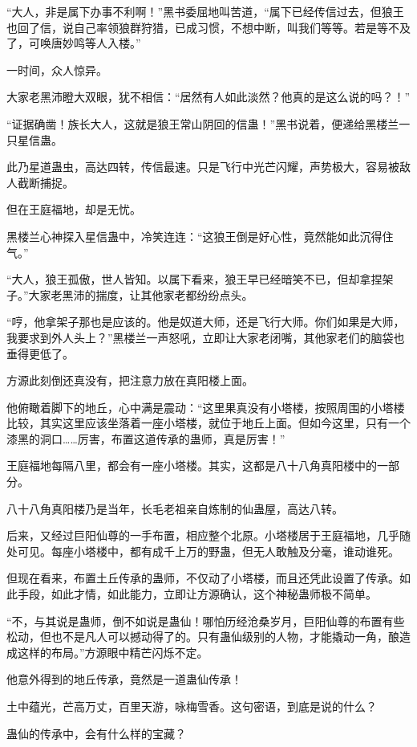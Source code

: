 \begin{this_body}
“大人，非是属下办事不利啊！”黑书委屈地叫苦道，“属下已经传信过去，但狼王也回了信，说自己率领狼群狩猎，已成习惯，不想中断，叫我们等等。若是等不及了，可唤唐妙鸣等人入楼。”

一时间，众人惊异。

大家老黑沛瞪大双眼，犹不相信：“居然有人如此淡然？他真的是这么说的吗？！”

“证据确凿！族长大人，这就是狼王常山阴回的信蛊！”黑书说着，便递给黑楼兰一只星信蛊。

此乃星道蛊虫，高达四转，传信最速。只是飞行中光芒闪耀，声势极大，容易被敌人截断捕捉。

但在王庭福地，却是无忧。

黑楼兰心神探入星信蛊中，冷笑连连：“这狼王倒是好心性，竟然能如此沉得住气。”

“大人，狼王孤傲，世人皆知。以属下看来，狼王早已经暗笑不已，但却拿捏架子。”大家老黑沛的揣度，让其他家老都纷纷点头。

“哼，他拿架子那也是应该的。他是奴道大师，还是飞行大师。你们如果是大师，我要求到外人头上？”黑楼兰一声怒吼，立即让大家老闭嘴，其他家老们的脑袋也垂得更低了。

方源此刻倒还真没有，把注意力放在真阳楼上面。

他俯瞰着脚下的地丘，心中满是震动：“这里果真没有小塔楼，按照周围的小塔楼比较，其实这里应该坐落着一座小塔楼，就位于地丘上面。但如今这里，只有一个漆黑的洞口……厉害，布置这道传承的蛊师，真是厉害！”

王庭福地每隔八里，都会有一座小塔楼。其实，这都是八十八角真阳楼中的一部分。

八十八角真阳楼乃是当年，长毛老祖亲自炼制的仙蛊屋，高达八转。

后来，又经过巨阳仙尊的一手布置，相应整个北原。小塔楼居于王庭福地，几乎随处可见。每座小塔楼中，都有成千上万的野蛊，但无人敢触及分毫，谁动谁死。

但现在看来，布置土丘传承的蛊师，不仅动了小塔楼，而且还凭此设置了传承。如此手段，如此才情，如此能力，立即让方源确认，这个神秘蛊师极不简单。

“不，与其说是蛊师，倒不如说是蛊仙！哪怕历经沧桑岁月，巨阳仙尊的布置有些松动，但也不是凡人可以撼动得了的。只有蛊仙级别的人物，才能撬动一角，酿造成这样的布局。”方源眼中精芒闪烁不定。

他意外得到的地丘传承，竟然是一道蛊仙传承！

土中蕴光，芒高万丈，百里天游，咏梅雪香。这句密语，到底是说的什么？

蛊仙的传承中，会有什么样的宝藏？


\end{this_body}
